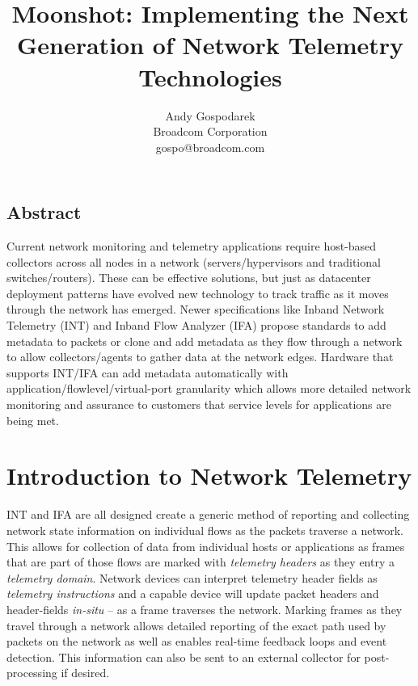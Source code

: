 \documentclass[letterpaper,twocolumn,10pt]{article}
\begin{document}
\date{}

\title{\Large \bf Moonshot: Implementing the Next Generation of Network
Telemetry Technologies}

\author{
{\rm Andy Gospodarek}\\
Broadcom Corporation\\
gospo@broadcom.com
} %

\maketitle

\subsection*{Abstract}
Current network monitoring and telemetry applications require host-based
collectors across all nodes in a network (servers/hypervisors
and traditional switches/routers). These can be effective solutions,
but just as datacenter deployment patterns have evolved new technology
to track traffic as it moves through the network has emerged. Newer
specifications like Inband Network Telemetry\cite{INT} (INT) and Inband
Flow Analyzer\cite{IFA} (IFA) propose standards to add metadata to
packets or clone and add metadata as they flow through a network to
allow collectors/agents to gather data at the network edges. Hardware
that supports INT/IFA can add metadata automatically with
application/flowlevel/virtual-port granularity which allows more
detailed network monitoring and assurance to customers that service
levels for applications are being met.

\section{Introduction to Network Telemetry}

INT and IFA are all designed create a generic method of reporting and
collecting network state information on individual flows as the packets
traverse a network.  This allows for collection of data from individual
hosts or applications as frames that are part of those flows are marked
with \textit{telemetry headers} as they entry a \textit{telemetry
domain}.  Network devices can interpret telemetry header fields as
\textit{telemetry instructions} and a capable device will update packet
headers and header-fields \textit{in-situ} -- as a frame traverses the
network.  Marking frames as they travel through a network allows
detailed reporting of the exact path used by packets on the
network as well as enables real-time feedback loops and event detection.
This information can also be sent to an external collector for
post-processing if desired.  
\end{document}
